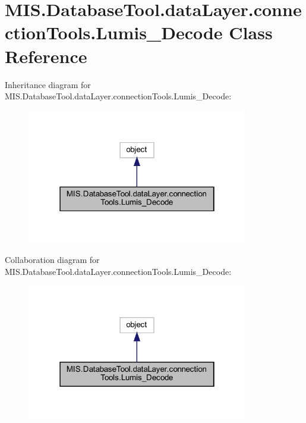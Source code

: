 \hypertarget{classMIS_1_1DatabaseTool_1_1dataLayer_1_1connectionTools_1_1Lumis__Decode}{}\section{M\+I\+S.\+Database\+Tool.\+data\+Layer.\+connection\+Tools.\+Lumis\+\_\+\+Decode Class Reference}
\label{classMIS_1_1DatabaseTool_1_1dataLayer_1_1connectionTools_1_1Lumis__Decode}


Inheritance diagram for M\+I\+S.\+Database\+Tool.\+data\+Layer.\+connection\+Tools.\+Lumis\+\_\+\+Decode\+:\nopagebreak
\begin{figure}[H]
\begin{center}
\leavevmode
\includegraphics[width=274pt]{classMIS_1_1DatabaseTool_1_1dataLayer_1_1connectionTools_1_1Lumis__Decode__inherit__graph}
\end{center}
\end{figure}


Collaboration diagram for M\+I\+S.\+Database\+Tool.\+data\+Layer.\+connection\+Tools.\+Lumis\+\_\+\+Decode\+:\nopagebreak
\begin{figure}[H]
\begin{center}
\leavevmode
\includegraphics[width=274pt]{classMIS_1_1DatabaseTool_1_1dataLayer_1_1connectionTools_1_1Lumis__Decode__coll__graph}
\end{center}
\end{figure}
